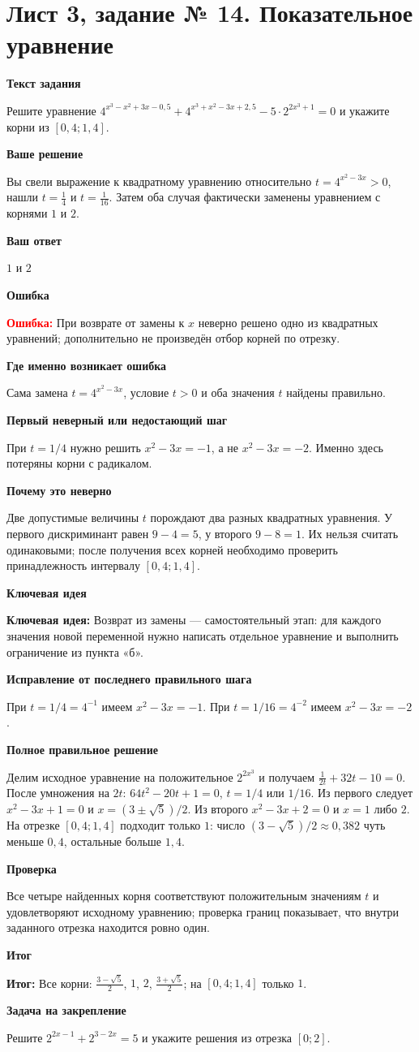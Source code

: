\documentclass[11pt,a4paper]{article}
\newcommand{\Idea}{\textcolor{blue!60!black}{\textbf{Ключевая идея:}}}
\newcommand{\Res}{\textcolor{teal!60!black}{\textbf{Итог:}}}
\newcommand{\Heading}[2]{\par\medskip\textbf{#1}\par#2\par}
\begin{document}
\section*{Лист 3, задание № 14. Показательное уравнение}
\Heading{Текст задания}{Решите уравнение $4^{x^3-x^2+3x-0{,}5}+4^{x^3+x^2-3x+2{,}5}-5\cdot2^{2x^3+1}=0$ и укажите корни из $[0{,}4;1{,}4]$.}
\Heading{Ваше решение}{Вы свели выражение к квадратному уравнению относительно $t=4^{x^2-3x}>0$, нашли $t=\frac14$ и $t=\frac1{16}$. Затем оба случая фактически заменены уравнением с корнями $1$ и $2$.}
\Heading{Ваш ответ}{$1$ и $2$}
\Heading{Ошибка}{\textcolor{red}{\textbf{Ошибка:}} При возврате от замены к $x$ неверно решено одно из квадратных уравнений; дополнительно не произведён отбор корней по отрезку.}
\Heading{Где именно возникает ошибка}{Сама замена $t=4^{x^2-3x}$, условие $t>0$ и оба значения $t$ найдены правильно.}
\Heading{Первый неверный или недостающий шаг}{При $t=1/4$ нужно решить $x^2-3x=-1$, а не $x^2-3x=-2$. Именно здесь потеряны корни с радикалом.}
\Heading{Почему это неверно}{Две допустимые величины $t$ порождают два разных квадратных уравнения. У первого дискриминант равен $9-4=5$, у второго $9-8=1$. Их нельзя считать одинаковыми; после получения всех корней необходимо проверить принадлежность интервалу $[0{,}4;1{,}4]$.}
\Heading{Ключевая идея}{\Idea{} Возврат из замены --- самостоятельный этап: для каждого значения новой переменной нужно написать отдельное уравнение и выполнить ограничение из пункта «б».}
\Heading{Исправление от последнего правильного шага}{При $t=1/4=4^{-1}$ имеем $x^2-3x=-1$. При $t=1/16=4^{-2}$ имеем $x^2-3x=-2$.}
\Heading{Полное правильное решение}{Делим исходное уравнение на положительное $2^{2x^3}$ и получаем $\frac1{2t}+32t-10=0$. После умножения на $2t$: $64t^2-20t+1=0$, $t=1/4$ или $1/16$. Из первого следует $x^2-3x+1=0$ и $x=(3\pm\sqrt5)/2$. Из второго $x^2-3x+2=0$ и $x=1$ либо $2$. На отрезке $[0{,}4;1{,}4]$ подходит только $1$: число $(3-\sqrt5)/2\approx0{,}382$ чуть меньше $0{,}4$, остальные больше $1{,}4$.}
\Heading{Проверка}{Все четыре найденных корня соответствуют положительным значениям $t$ и удовлетворяют исходному уравнению; проверка границ показывает, что внутри заданного отрезка находится ровно один.}
\Heading{Итог}{\Res{} Все корни: $\frac{3-\sqrt5}2$, $1$, $2$, $\frac{3+\sqrt5}2$; на $[0{,}4;1{,}4]$ только $1$.}
\Heading{Задача на закрепление}{Решите $2^{2x-1}+2^{3-2x}=5$ и укажите решения из отрезка $[0;2]$.}
\newpage
{}\label{task:3_16}
\end{document}
